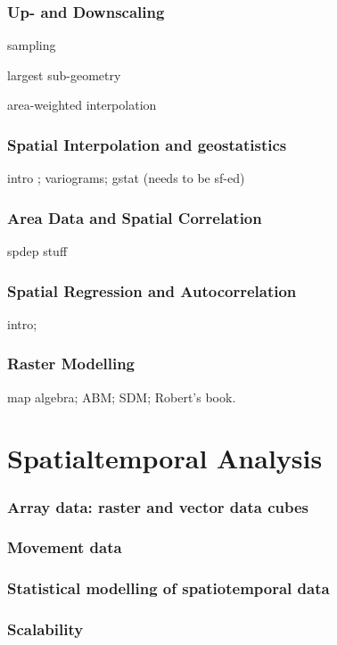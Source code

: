 \documentclass[]{krantz}
\theoremstyle{definition}
\theoremstyle{definition}
\theoremstyle{definition}
\theoremstyle{remark}
\begin{document}
\section{Up- and Downscaling}\label{up--and-downscaling}

sampling

largest sub-geometry

area-weighted interpolation

\section{Spatial Interpolation and
geostatistics}\label{spatial-interpolation-and-geostatistics}

intro ; variograms; gstat (needs to be sf-ed)

\section{Area Data and Spatial
Correlation}\label{area-data-and-spatial-correlation}

spdep stuff

\section{Spatial Regression and
Autocorrelation}\label{spatial-regression-and-autocorrelation}

intro;

\section{Raster Modelling}\label{raster-modelling}

map algebra; ABM; SDM; Robert's book.

\part{Spatialtemporal
Analysis}\label{part-spatialtemporal-analysis}

\section{Array data: raster and vector data
cubes}\label{array-data-raster-and-vector-data-cubes}

\section{Movement data}\label{movement-data}

\section{Statistical modelling of spatiotemporal
data}\label{statistical-modelling-of-spatiotemporal-data}

\section{Scalability}\label{scalability}


\end{document}

